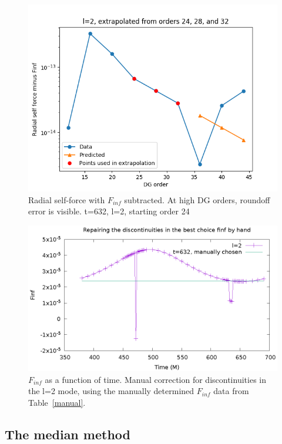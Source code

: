 \begin{figure}
  \includegraphics{extrapolate7t632l2i3}
  \caption{Radial self-force with $F_{inf}$ subtracted. At high DG orders, roundoff error is visible. t=632, l=2, starting order 24}
  \label{offset}
\end{figure}


\begin{figure}
  \includegraphics{bestFinfManuallyChosent632l2}
\caption{$F_{inf}$ as a function of time. Manual correction for discontinuities in the l=2 mode, using the manually determined $F_{inf}$ data from Table~\ref{manual}. }
\label{manualfix}          
\end{figure}

\subsection{The median method}

